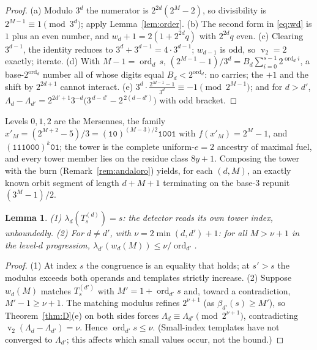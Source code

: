 \documentclass[11pt]{article}
\newtheorem{lemma}[theorem]{Lemma}
\theoremstyle{definition}
\theoremstyle{remark}
\newcommand{\ord}{\operatorname{ord}}
\DeclareMathOperator{\vv}{v}
\begin{document}
\begin{proof}
(a) Modulo $3^{d}$ the numerator is $2^{2d}(2^{M}-2)$, so divisibility
is $2^{M-1}\equiv1\pmod{3^d}$; apply Lemma~\ref{lem:order}.
(b) The second form in \eqref{eq:wd} is $1$ plus an even number, and
$w_d+1=2(1+2^{2d}q)$ with $2^{2d}q$ even.
(c) Clearing $3^{d-1}$, the identity reduces to
$3^{d}+3^{d-1}=4\cdot3^{d-1}$; $w_{d-1}$ is odd, so $\vv_2=2$ exactly;
iterate.
(d) With $M-1=\ord_d\,s$,
$(2^{M-1}-1)/3^{d}=B_d\sum_{i=0}^{s-1}2^{\ord_d i}$, a
base-$2^{\ord_d}$ number all of whose digits equal $B_d<2^{\ord_d}$: no
carries; the $+1$ and the shift by $2^{2d+1}$ cannot interact.
(e) $3^{d}\cdot\tfrac{2^{M-1}-1}{3^{d}}\equiv-1\pmod{2^{M-1}}$; and for
$d>d'$,
$\Lambda_d-\Lambda_{d'}=2^{2d'+1}3^{-d}\bigl(3^{\,d-d'}-2^{\,2(d-d')}\bigr)$
with odd bracket.
\end{proof}

Levels $0,1,2$ are the Mersennes, the family
$x'_M=(2^{M+2}-5)/3=(\texttt{10})^{(M-3)/2}\texttt{1001}$ with
$f(x'_M)=2^M-1$, and $(\texttt{111000})^{k}\texttt{01}$; the tower is
the complete uniform-$e{=}2$ ancestry of maximal fuel, and every tower
member lies on the residue class $8y+1$. Composing the tower with the
burn (Remark~\ref{rem:andaloro}) yields, for each $(d,M)$, an exactly
known orbit segment of length $d+M+1$ terminating on the base-$3$
repunit $(3^{M}-1)/2$.

\begin{lemma}\label{lem:detfacts}
(1) $\lambda_d(T^{(d)}_s)=s$: the detector reads its own tower index,
unboundedly. (2) For $d\ne d'$, with $\nu=2\min(d,d')+1$: for all
$M>\nu+1$ in the level-$d$ progression,
$\lambda_{d'}(w_d(M))\le\nu/\ord_{d'}$.
\end{lemma}

\begin{proof}
(1) At index $s$ the congruence is an equality that holds; at $s'>s$
the modulus exceeds both operands and templates strictly increase.
(2) Suppose $w_d(M)$ matches $T^{(d')}_s$ with $M'=1+\ord_{d'}s$ and,
toward a contradiction, $M'-1\ge\nu+1$. The matching modulus refines
$2^{\nu+1}$ (as $\beta_{d'}(s)\ge M'$), so Theorem~\ref{thm:D}(e) on
both sides forces $\Lambda_d\equiv\Lambda_{d'}\pmod{2^{\nu+1}}$,
contradicting $\vv_2(\Lambda_d-\Lambda_{d'})=\nu$. Hence
$\ord_{d'}s\le\nu$. (Small-index templates have not converged to
$\Lambda_{d'}$; this affects which small values occur, not the bound.)
\end{proof}
\end{document}
